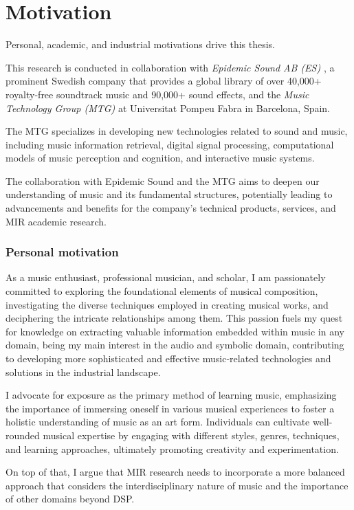 \section{Motivation}

Personal, academic, and industrial motivations drive this thesis. 

This research is conducted in collaboration with \textit{Epidemic Sound AB (ES)} \cite{EpidemicSite}, a prominent Swedish company that provides a global library of over 40,000+ royalty-free soundtrack music and 90,000+ sound effects, and the \textit{Music Technology Group (MTG)} at Universitat Pompeu Fabra in Barcelona, Spain. 

The MTG specializes in developing new technologies related to sound and music, including music information retrieval, digital signal processing, computational models of music perception and cognition, and interactive music systems. 

The collaboration with Epidemic Sound and the MTG aims to deepen our understanding of music and its fundamental structures, potentially leading to advancements and benefits for the company's technical products, services, and MIR academic research.

\subsubsection{Personal motivation}

As a music enthusiast, professional musician, and scholar, I am passionately committed to exploring the foundational elements of musical composition, investigating the diverse techniques employed in creating musical works, and deciphering the intricate relationships among them. This passion fuels my quest for knowledge on extracting valuable information embedded within music in any domain, being my main interest in the audio and symbolic domain, contributing to developing more sophisticated and effective music-related technologies and solutions in the industrial landscape.

I advocate for exposure as the primary method of learning music, emphasizing the importance of immersing oneself in various musical experiences to foster a holistic understanding of music as an art form. Individuals can cultivate well-rounded musical expertise by engaging with different styles, genres, techniques, and learning approaches, ultimately promoting creativity and experimentation.

On top of that, I argue that MIR research needs to incorporate a more balanced approach that considers the interdisciplinary nature of music and the importance of other domains beyond DSP.

